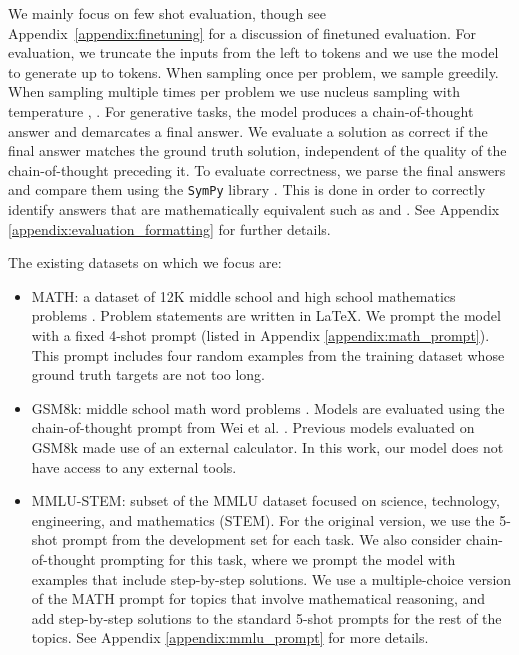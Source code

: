 \documentclass{article}
\begin{document}
We mainly focus on few shot evaluation, though see Appendix~\ref{appendix:finetuning} for a discussion of finetuned evaluation.
For evaluation, we truncate the inputs from the left to  tokens and we use the model to generate up to  tokens. When sampling once per problem, we sample greedily. When sampling multiple times per problem we use nucleus sampling \citep{nucleus_sampling} with temperature , .
For generative tasks, the model produces a chain-of-thought answer and demarcates a final answer. We evaluate a solution as correct if the final answer matches the ground truth solution, independent of the quality of the chain-of-thought preceding it. 
To evaluate correctness, we parse the final answers and compare them using the \texttt{SymPy} library \citep{sympy}. This is done in order to correctly identify answers that are mathematically equivalent such as  and . See Appendix \ref{appendix:evaluation_formatting} for further details.

The existing datasets on which we focus are:

\begin{itemize}
    \item MATH: a dataset of 12K middle school and high school mathematics problems \cite{MATH}. Problem statements are written in \LaTeX{}. We prompt the model with a fixed 4-shot prompt (listed in Appendix \ref{appendix:math_prompt}).
    This prompt includes four random examples from the training dataset whose ground truth targets are not too long.
    \item GSM8k: middle school math word problems \cite{gsm8k}. Models are evaluated using the chain-of-thought prompt from Wei et al. \cite{chain_of_thought}. Previous models evaluated on GSM8k made use of an external calculator. In this work, our model does not have access to any external tools. 
    \item MMLU-STEM: subset of the MMLU dataset \citep{MMLU} focused on science, technology, engineering, and mathematics (STEM). For the original version, we use the 5-shot prompt from the development set for each task. We also consider chain-of-thought prompting for this task, where we prompt the model with examples that include step-by-step solutions. We use a multiple-choice version of the MATH prompt for topics that involve mathematical reasoning, and add step-by-step solutions to the standard 5-shot prompts for the rest of the topics. See Appendix \ref{appendix:mmlu_prompt} for more details.
    
\end{itemize}
\end{document}

